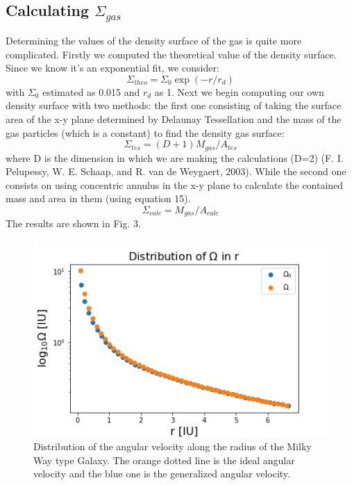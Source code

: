 \documentclass{aa}
\begin{document}
   \subsection{Calculating $\Sigma_{gas}$}
   Determining the values of the density surface of the gas is quite more complicated. Firstly we computed the theoretical value of the density surface. Since we know it's an exponential fit, we consider: 
   \begin{equation}
       \Sigma_{theo} = \Sigma_0 \exp{(-r/r_d)}
   \end{equation}
   with $\Sigma_0$ estimated as 0.015 and $r_d$ as 1. Next we begin computing our own density surface with two methods: the first one consisting of taking the surface area of the x-y plane determined by Delaunay Tessellation and the mass of the gas particles (which is a constant) to find the density gas surface:
   \begin{equation}
       \Sigma_{tes} = (D+1) M_{gas}/A_{tes}
   \end{equation}
   where D is the dimension in which we are making the calculations (D=2) (F. I. Pelupessy, W. E. Schaap, and R. van de Weygaert, 2003).
   While the second one consists on using concentric annulus in the x-y plane to calculate the contained mass and area in them (using equation 15). 
   \begin{equation}
       \Sigma_{calc} = M_{gas}/A_{calc}
   \end{equation}
   The results are shown in Fig. 3. 
   \begin{figure}[h!]
   \includegraphics[scale=0.55]{Distribution_w.png}
   \caption{Distribution of the angular velocity along the radius of the Milky Way type Galaxy. The orange dotted line is the ideal angular velocity and the blue one is the generalized angular velocity.}
   \centering
   \label{fig:boat1}
   \end{figure}
   
\end{document}
